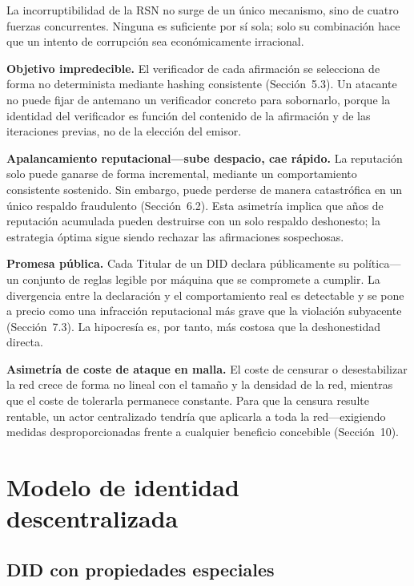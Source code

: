 \documentclass[11pt,a4paper,twocolumn]{article}
\begin{document}
La incorruptibilidad de la RSN no surge de un único mecanismo, sino de cuatro fuerzas concurrentes. Ninguna es suficiente por sí sola; solo su combinación hace que un intento de corrupción sea económicamente irracional.

\textbf{Objetivo impredecible.} El verificador de cada afirmación se selecciona de forma no determinista mediante hashing consistente (Sección~5.3). Un atacante no puede fijar de antemano un verificador concreto para sobornarlo, porque la identidad del verificador es función del contenido de la afirmación y de las iteraciones previas, no de la elección del emisor.

\textbf{Apalancamiento reputacional---sube despacio, cae rápido.} La reputación solo puede ganarse de forma incremental, mediante un comportamiento consistente sostenido. Sin embargo, puede perderse de manera catastrófica en un único respaldo fraudulento (Sección~6.2). Esta asimetría implica que años de reputación acumulada pueden destruirse con un solo respaldo deshonesto; la estrategia óptima sigue siendo rechazar las afirmaciones sospechosas.

\textbf{Promesa pública.} Cada Titular de un DID declara públicamente su política---un conjunto de reglas legible por máquina que se compromete a cumplir. La divergencia entre la declaración y el comportamiento real es detectable y se pone a precio como una infracción reputacional más grave que la violación subyacente (Sección~7.3). La hipocresía es, por tanto, más costosa que la deshonestidad directa.

\textbf{Asimetría de coste de ataque en malla.} El coste de censurar o desestabilizar la red crece de forma no lineal con el tamaño y la densidad de la red, mientras que el coste de tolerarla permanece constante. Para que la censura resulte rentable, un actor centralizado tendría que aplicarla a toda la red---exigiendo medidas desproporcionadas frente a cualquier beneficio concebible (Sección~10).

\section{Modelo de identidad descentralizada}

\subsection{DID con propiedades especiales}
\end{document}
